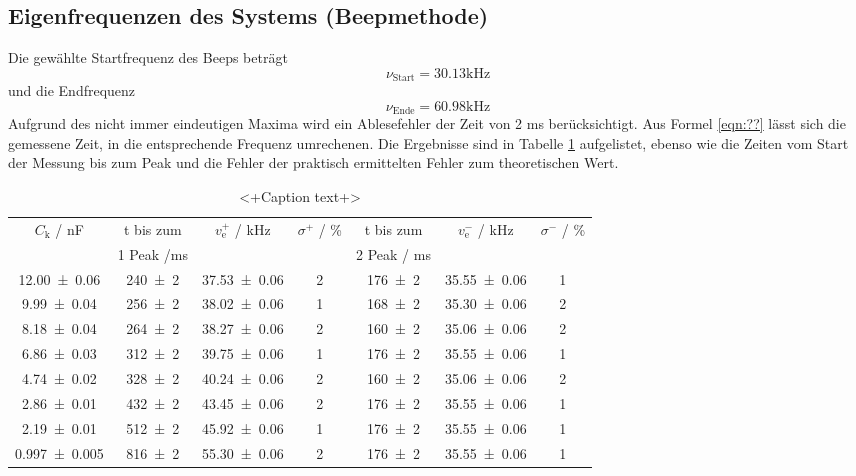 \subsection{Eigenfrequenzen des Systems (Beepmethode)}
Die gewählte Startfrequenz des Beeps beträgt 
\begin{equation}
  \nu_\text{Start} = 30.13 \text{kHz}
\end{equation} 
und die Endfrequenz 
\begin{equation}
  \nu_\text{Ende} = 60.98 \text{kHz}
\end{equation}
Aufgrund des nicht immer eindeutigen Maxima wird ein Ablesefehler der Zeit von 2 ms berücksichtigt. Aus Formel \ref{eqn:??} lässt sich die gemessene Zeit, in die entsprechende Frequenz umrechenen. Die Ergebnisse sind in Tabelle \ref{tab:beep} aufgelistet, ebenso wie die Zeiten vom Start der Messung bis zum Peak und die Fehler der praktisch ermittelten Fehler zum theoretischen Wert.
\begin{table}
  \centering
  \begin{tabular}{c c c c c c c}
    \toprule
    $C_\text{k}$ / nF & t bis zum & $v_\text{e}^+$ / kHz & $\sigma^+$ / \% & t bis zum & $v_\text{e}^-$ / kHz & $\sigma^-$ / \%  \\
    &1 Peak /ms& & & 2 Peak / ms & & \\
    \midrule
    \num{12.00 +- 0.06}     & \num{240 +- 2} &\num{37.53 +- 0.06} & 2 & \num{176 +- 2} & \num{35.55 +- 0.06} & 1 \\
    \num{9.99 +- 0.04}      & \num{256 +- 2} &\num{38.02 +- 0.06} & 1 & \num{168 +- 2} & \num{35.30 +- 0.06} & 2 \\
    \num{8.18 +- 0.04}      & \num{264 +- 2} &\num{38.27 +- 0.06} & 2 & \num{160 +- 2} & \num{35.06 +- 0.06} & 2 \\
    \num{6.86 +- 0.03}      & \num{312 +- 2} &\num{39.75 +- 0.06} & 1 & \num{176 +- 2} & \num{35.55 +- 0.06} & 1 \\
    \num{4.74 +- 0.02}      & \num{328 +- 2} &\num{40.24 +- 0.06} & 2 & \num{160 +- 2} & \num{35.06 +- 0.06} & 2 \\
    \num{2.86 +- 0.01}      & \num{432 +- 2} &\num{43.45 +- 0.06} & 2 & \num{176 +- 2} & \num{35.55 +- 0.06} & 1 \\
    \num{2.19 +- 0.01}      & \num{512 +- 2} &\num{45.92 +- 0.06} & 1 & \num{176 +- 2} & \num{35.55 +- 0.06} & 1 \\
    \num{0.997 +- 0.005}    & \num{816 +- 2} &\num{55.30 +- 0.06} & 2 & \num{176 +- 2} & \num{35.55 +- 0.06} & 1 \\
    \bottomrule
  \end{tabular}
  \caption{<+Caption text+>}
  \label{tab:beep}
\end{table}

